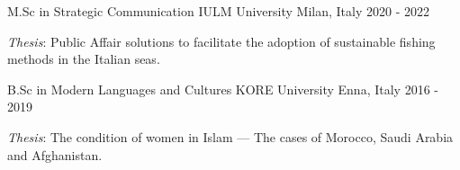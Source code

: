 
\begin{cventries}

\cventry
{M.Sc in Strategic Communication} %
{IULM University} %
{Milan, Italy} %
{2020 - 2022} %
{
\begin{cvitems}
\item \textit{Thesis}: Public Affair solutions to facilitate the adoption of sustainable fishing methods in the Italian seas.
\end{cvitems}
}

\cventry
{B.Sc in Modern Languages and Cultures} %
{KORE University} %
{Enna, Italy} %
{2016 - 2019} %
{
\begin{cvitems}
\item \textit{Thesis}: The condition of women in Islam  ---  The cases of Morocco, Saudi Arabia and Afghanistan.
\end{cvitems}
}

\end{cventries}
